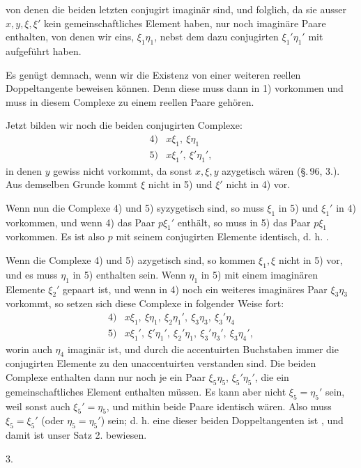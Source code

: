 von denen die beiden letzten conjugirt imaginär sind, und folglich, da
sie ausser $x, y, \xi, \xi'$ kein gemeinschaftliches Element haben, nur
noch imaginäre Paare enthalten, von denen wir eins, $\xi_1\eta_1$, nebst
dem dazu conjugirten $\xi_1'\eta_1'$ mit aufgeführt haben.

Es genügt demnach, wenn wir die Existenz von einer weiteren reellen
Doppeltangente beweisen können. Denn diese muss dann in 1) vorkommen
und muss in diesem Complexe zu einem reellen Paare gehören.

Jetzt bilden wir noch die beiden conjugirten Complexe:
\[
\begin{array}{rl}
4) & x\xi_1,\ \xi\eta_1 \\
5) & x\xi_1',\ \xi'\eta_1',
\end{array}
\]
in denen $y$ gewiss nicht vorkommt, da sonst $x, \xi, y$ azygetisch wären
(\S.\,96, 3.). Aus demselben Grunde kommt $\xi$ nicht in 5) und $\xi'$
nicht in 4) vor.

Wenn nun  die Complexe 4) und 5) syzygetisch sind, so muss
$\xi_1$ in 5) und $\xi_1'$ in 4) vorkommen, und wenn 4) das Paar $p\xi_1'$
enthält, so muss in 5) das Paar $p\xi_1$ vorkommen. Es ist also $p$ mit
seinem conjugirten Elemente identisch, d. h. .

Wenn  die Complexe 4) und 5) azygetisch sind, so kommen
$\xi_1, \xi$ nicht in 5) vor, und es muss $\eta_1$ in 5) enthalten sein.
Wenn $\eta_1$ in 5) mit einem imaginären Elemente $\xi_2'$ gepaart ist, und
wenn in 4) noch ein weiteres imaginäres Paar $\xi_3\eta_3$ vorkommt, so
setzen sich diese Complexe in folgender Weise fort:
\[
\begin{array}{rl}
4) & x\xi_1,\ \xi\eta_1,\ \xi_2\eta_1',\ \xi_3\eta_3,\ \xi_3'\eta_4 \\
5) & x\xi_1',\ \xi'\eta_1',\ \xi_2'\eta_1,\ \xi_3'\eta_3',\ \xi_3\eta_4',
\end{array}
\]
worin auch $\eta_4$ imaginär ist, und durch die accentuirten Buchstaben
immer die conjugirten Elemente zu den unaccentuirten verstanden sind.
Die beiden Complexe enthalten dann nur noch je ein Paar $\xi_5\eta_5$,
$\xi_5'\eta_5'$, die ein gemeinschaftliches Element enthalten müssen. Es
kann aber nicht $\xi_5 = \eta_5'$ sein, weil sonst auch $\xi_5' = \eta_5$, und
mithin beide Paare identisch wären. Also muss $\xi_5 = \xi_5'$ (oder
$\eta_5 = \eta_5'$) sein; d. h. eine dieser beiden Doppeltangenten
ist , und damit ist unser Satz 2. bewiesen.

3. 
